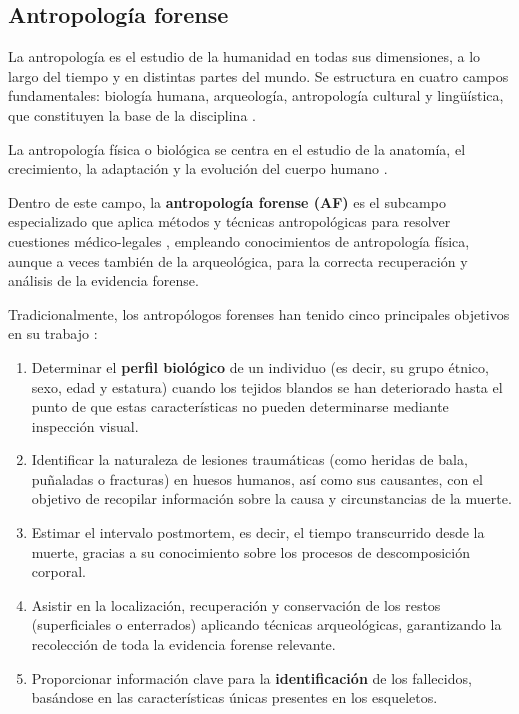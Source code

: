 


\subsection{Antropología forense}

La antropología es el estudio de la humanidad en todas sus dimensiones, a lo largo del tiempo y en distintas partes del 
mundo. Se estructura en cuatro campos fundamentales: biología humana, arqueología, antropología cultural y lingüística, 
que constituyen la base de la disciplina \cite{AAA2022AnthropologyDefinition}.

La antropología física o biológica se centra en el estudio de la anatomía, el crecimiento, la adaptación y la evolución 
del cuerpo humano \cite{nawrocki1996OutlineFA}.

Dentro de este campo, la \textbf{antropología forense (AF)} es el subcampo especializado que aplica métodos y técnicas 
antropológicas para resolver cuestiones médico-legales \cite{nawrocki1996OutlineFA}, empleando conocimientos de antropología 
física, aunque a veces también de la arqueológica, para la correcta recuperación y análisis de la evidencia forense.

Tradicionalmente, los antropólogos forenses han tenido cinco principales objetivos en su trabajo \cite{byers2023}:

\begin{enumerate}

    \item Determinar el \textbf{perfil biológico} de un individuo (es decir, su grupo étnico, sexo, edad y estatura) 
    cuando los tejidos blandos se han deteriorado hasta el punto de que estas características no pueden determinarse
    mediante inspección visual. 

    \item Identificar la naturaleza de lesiones traumáticas (como heridas de bala, puñaladas o fracturas) en huesos humanos, 
    así como sus causantes, con el objetivo de recopilar información sobre la causa y circunstancias de la muerte.

    \item Estimar el intervalo postmortem, es decir, el tiempo transcurrido desde la muerte, gracias a su conocimiento sobre
    los procesos de descomposición corporal.
    
    \item Asistir en la localización, recuperación y conservación de los restos (superficiales o enterrados) aplicando 
    técnicas arqueológicas, garantizando la recolección de toda la evidencia forense relevante.

    \item Proporcionar información clave para la \textbf{identificación} de los fallecidos, basándose en las características
    únicas presentes en los esqueletos. 

\end{enumerate}

